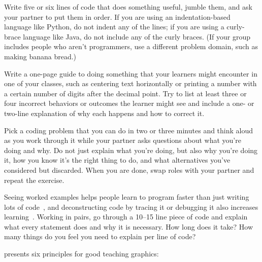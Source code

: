 
Write five or six lines of code that does something useful,
jumble them,
and ask your partner to put them in order.
If you are using an indentation-based language like Python,
do not indent any of the lines;
if you are using a curly-brace language like Java,
do not include any of the curly braces.
(If your group includes people who aren't programmers,
use a different problem domain,
such as making banana bread.)


Write a one-page guide to doing something that your learners might encounter in one of your classes,
such as centering text horizontally
or printing a number with a certain number of digits after the decimal point.
Try to list at least three or four incorrect behaviors or outcomes the learner might see
and include a one- or two-line explanation
of why each happens and how to correct it.


Pick a coding problem that you can do in two or three minutes
and think aloud as you work through it
while your partner asks questions about what you're doing and why.
Do not just explain what you're doing,
but also why you're doing it,
how you know it's the right thing to do,
and what alternatives you've considered but discarded.
When you are done,
swap roles with your partner and repeat the exercise.


Seeing worked examples helps people learn to program faster than just writing lots of code~\cite{Skud2014},
and deconstructing code by tracing it or debugging it also increases learning~\cite{Grif2016}.
Working in pairs,
go through a 10--15 line piece of code and explain what every statement does
and why it is necessary.
How long does it take?
How many things do you feel you need to explain per line of code?


\cite{Maye2009,Mill2016a} presents six principles for good teaching graphics:

